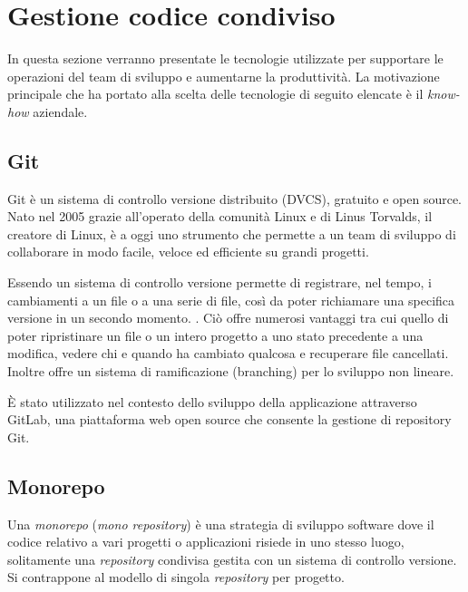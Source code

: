 \section{Gestione codice condiviso}
In questa sezione verranno presentate le tecnologie utilizzate per supportare le operazioni
del team di sviluppo e aumentarne la produttività.
La motivazione principale che ha portato alla scelta delle tecnologie di seguito elencate è il \textit{know-how} aziendale.

\subsection{Git}
Git \cite{Git} è un sistema di controllo versione distribuito (DVCS), gratuito e open source.
Nato nel 2005 grazie all'operato della comunità Linux e di Linus Torvalds, il creatore di Linux, è a oggi uno strumento che
permette a un team di sviluppo di collaborare in modo facile, veloce ed efficiente su grandi progetti.

Essendo un sistema di controllo versione permette di registrare, nel tempo, i cambiamenti a un file o a una serie di file,
così da poter richiamare una specifica versione in un secondo momento. \cite{GitPro}.
Ciò offre numerosi vantaggi tra cui quello di poter ripristinare un file o un intero progetto a uno stato precedente a una modifica,
vedere chi e quando ha cambiato qualcosa e recuperare file cancellati.
Inoltre offre un sistema di ramificazione (branching) per lo sviluppo non lineare.

È stato utilizzato nel contesto dello sviluppo della applicazione attraverso GitLab, una piattaforma web open source che consente
la gestione di repository Git.

\subsection{Monorepo}
Una \textit{monorepo}\cite{Google-Monorepo} (\textit{mono repository}) è una strategia di sviluppo software dove il codice
relativo a vari progetti o applicazioni risiede in uno stesso luogo, solitamente una \textit{repository} condivisa
gestita con un sistema di controllo versione.
Si contrappone al modello di singola \textit{repository} per progetto.

